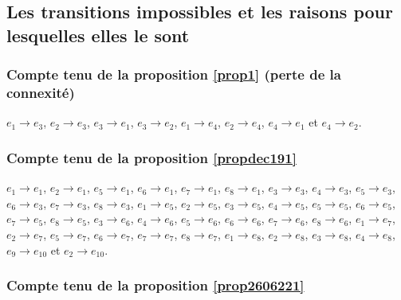 \begin{spacing}{0.30}
\subsection*{Les transitions impossibles et les raisons pour lesquelles elles le sont}
\end{spacing}
\begin{spacing}{0.30}
\subsubsection*{Compte tenu de la proposition \ref{prop1} (perte de la connexité)}
\end{spacing}
$e_{1}\rightarrow e_{3}$, $e_{2}\rightarrow e_{3}$, $e_{3}\rightarrow e_{1}$, $e_{3}\rightarrow e_{2}$, $e_{1}\rightarrow e_{4}$, $e_{2}\rightarrow e_{4}$, $e_{4}\rightarrow e_{1}$ et $e_{4}\rightarrow e_{2}$.
\begin{spacing}{0.30}
\subsubsection*{Compte tenu de la proposition \ref{propdec191}}
\end{spacing}
$e_{1}\rightarrow e_{1}$, $e_{2}\rightarrow e_{1}$, $e_{5}\rightarrow e_{1}$, $e_{6}\rightarrow e_{1}$, $e_{7}\rightarrow e_{1}$, $e_{8}\rightarrow e_{1}$, $e_{3}\rightarrow e_{3}$, $e_{4}\rightarrow e_{3}$, $e_{5}\rightarrow e_{3}$, $e_{6}\rightarrow e_{3}$, $e_{7}\rightarrow e_{3}$, $e_{8}\rightarrow e_{3}$, $e_{1}\rightarrow e_{5}$, $e_{2}\rightarrow e_{5}$, $e_{3}\rightarrow e_{5}$, $e_{4}\rightarrow e_{5}$, $e_{5}\rightarrow e_{5}$, $e_{6}\rightarrow e_{5}$, $e_{7}\rightarrow e_{5}$, $e_{8}\rightarrow e_{5}$, $e_{3}\rightarrow e_{6}$, $e_{4}\rightarrow e_{6}$, $e_{5}\rightarrow e_{6}$, $e_{6}\rightarrow e_{6}$, $e_{7}\rightarrow e_{6}$, $e_{8}\rightarrow e_{6}$, $e_{1}\rightarrow e_{7}$, $e_{2}\rightarrow e_{7}$, $e_{5}\rightarrow e_{7}$, $e_{6}\rightarrow e_{7}$, $e_{7}\rightarrow e_{7}$, $e_{8}\rightarrow e_{7}$, $e_{1}\rightarrow e_{8}$, $e_{2}\rightarrow e_{8}$, $e_{3}\rightarrow e_{8}$, $e_{4}\rightarrow e_{8}$, $e_{9}\rightarrow e_{10}$ et $e_{2}\rightarrow e_{10}$.
\begin{spacing}{0.30}
\subsubsection*{Compte tenu de la proposition \ref{prop2606221}}
\end{spacing}
